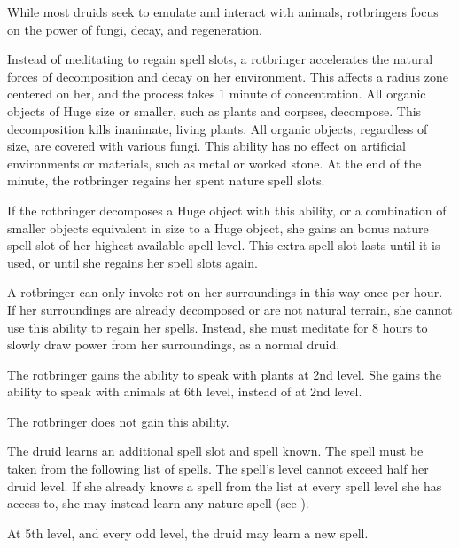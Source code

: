             While most druids seek to emulate and interact with animals, rotbringers focus on the power of fungi, decay, and regeneration.

             Instead of meditating to regain spell slots, a rotbringer accelerates the natural forces of decomposition and decay on her environment.
            This affects a \areahuge radius zone centered on her, and the process takes 1 minute of concentration.
            All organic objects of Huge size or smaller, such as plants and corpses, decompose.
            This decomposition kills inanimate, living plants.
            All organic objects, regardless of size, are covered with various fungi.
            This ability has no effect on artificial environments or materials, such as metal or worked stone.
            At the end of the minute, the rotbringer regains her spent nature spell slots.

            If the rotbringer decomposes a Huge object with this ability, or a combination of smaller objects equivalent in size to a Huge object, she gains an bonus nature spell slot of her highest available spell level.
            This extra spell slot lasts until it is used, or until she regains her spell slots again.

            A rotbringer can only invoke rot on her surroundings in this way once per hour.
            If her surroundings are already decomposed or are not natural terrain, she cannot use this ability to regain her spells.
            Instead, she must meditate for 8 hours to slowly draw power from her surroundings, as a normal druid.

             The rotbringer gains the ability to speak with plants at 2nd level.
            She gains the ability to speak with animals at 6th level, instead of at 2nd level.

             The rotbringer does not gain this ability.

             The druid learns an additional spell slot and spell known.
            The spell must be taken from the following list of spells.
            The spell's level cannot exceed half her druid level.
            If she already knows a spell from the list at every spell level she has access to, she may instead learn any nature spell (see ).

            At 5th level, and every odd level, the druid may learn a new spell.

